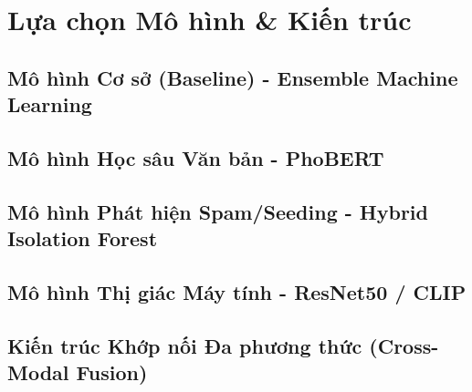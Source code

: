 \section{Lựa chọn Mô hình \& Kiến trúc}

\subsection{Mô hình Cơ sở (Baseline) - Ensemble Machine Learning}

\subsection{Mô hình Học sâu Văn bản - PhoBERT}

\subsection{Mô hình Phát hiện Spam/Seeding - Hybrid Isolation Forest}

\subsection{Mô hình Thị giác Máy tính - ResNet50 / CLIP}

\subsection{Kiến trúc Khớp nối Đa phương thức (Cross-Modal Fusion)}

\clearpage
